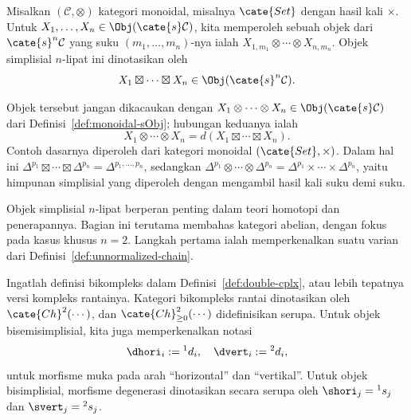 \begin{example}\label{eg:boxtimes-bisimplicial}
	Misalkan $(\mathcal{C},\otimes)$ kategori monoidal, misalnya
	$\cate{Set}$ dengan hasil kali $\times$. Untuk
	$X_1,\ldots,X_n\in\Obj(\cate{s}\mathcal{C})$, kita memperoleh sebuah
	objek dari $\cate{s}^n\mathcal{C}$ yang suku
	$(m_1,\ldots,m_n)$-nya ialah
	$X_{1,m_1}\otimes\cdots\otimes X_{n,m_n}$. Objek simplisial $n$-lipat
	ini dinotasikan oleh
	\[ X_1 \boxtimes \cdots \boxtimes X_n \in \Obj(\cate{s}^n \mathcal{C}). \]

	Objek tersebut jangan dikacaukan dengan
	$X_1\otimes\cdots\otimes X_n\in\Obj(\cate{s}\mathcal{C})$ dari
	Definisi~\ref{def:monoidal-sObj}; hubungan keduanya ialah
	\[ X_1 \otimes \cdots \otimes X_n = d(X_1 \boxtimes \cdots \boxtimes X_n). \]
	Contoh dasarnya diperoleh dari kategori monoidal
	$(\cate{Set},\times)$. Dalam hal ini
	$\Delta^{p_1}\boxtimes\cdots\boxtimes\Delta^{p_n}
	=\Delta^{p_1,\ldots,p_n}$, sedangkan
	$\Delta^{p_1}\otimes\cdots\otimes\Delta^{p_n}
	=\Delta^{p_1}\times\cdots\times\Delta^{p_n}$, yaitu himpunan
	simplisial yang diperoleh dengan mengambil hasil kali suku demi suku.
\end{example}

Objek simplisial $n$-lipat berperan penting dalam teori homotopi dan
penerapannya. Bagian ini terutama membahas kategori abelian, dengan
fokus pada kasus khusus $n=2$. Langkah pertama ialah memperkenalkan suatu
varian dari Definisi~\ref{def:unnormalized-chain}.

Ingatlah definisi bikompleks dalam Definisi~\ref{def:double-cplx}, atau lebih
tepatnya versi kompleks rantainya. Kategori bikompleks rantai dinotasikan
oleh $\cate{Ch}^2(\cdots)$, dan $\cate{Ch}^2_{\geq0}(\cdots)$ didefinisikan
serupa. Untuk objek bisemisimplisial, kita juga memperkenalkan notasi
\[ \dhori_i := {}^1 d_i , \quad \dvert_i := {}^2 d_i, \]
untuk morfisme muka pada arah ``horizontal'' dan ``vertikal''. Untuk objek
bisimplisial, morfisme degenerasi dinotasikan secara serupa oleh
$\shori_j={}^1s_j$ dan $\svert_j={}^2s_j$.

